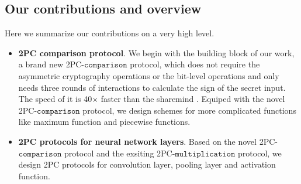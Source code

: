 \documentclass[letterpaper]{article} %
\begin{document}
    \subsection{Our contributions and overview}%
    Here we summarize our contributions on a very high level.


    \begin{itemize}
        \item \textbf{2PC comparison protocol}. 
        We begin with the building block of our work, a brand new 2PC-$\mathtt{comparison}$ protocol,
        which does not require the asymmetric cryptography operations or the bit-level operations 
        and only needs three rounds of interactions to calculate the sign of the secret input.
        The speed of it is 40$\times$ faster than the sharemind \cite{Sharemind}.
        Equiped with the novel 2PC-$\mathtt{comparison}$ protocol, we design schemes for more complicated functions 
        like maximum function and piecewise functions.

        \item \textbf{2PC protocols for neural network layers}.
        Based on the novel 2PC-$\mathtt{comparison}$ protocol and the exsiting 2PC-$\mathtt{multiplication}$ protocol,
        we design 2PC protocols for convolution layer, pooling layer and activation function.







\end{itemize}
\end{document}

